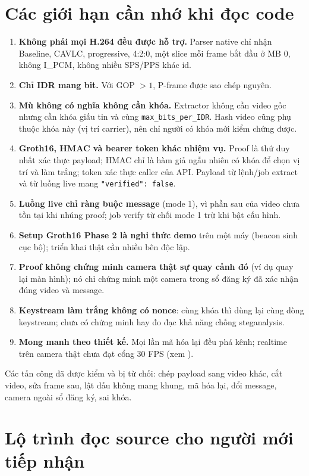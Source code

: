 \documentclass[11pt,a4paper]{article}
\begin{document}
\section{Các giới hạn cần nhớ khi đọc code}

\begin{enumerate}
  \item \textbf{Không phải mọi H.264 đều được hỗ trợ.} Parser native chỉ nhận
  Baseline, CAVLC, progressive, 4:2:0, một slice mỗi frame bắt đầu ở MB 0, không
  I\_PCM, không nhiều SPS/PPS khác id.
  \item \textbf{Chỉ IDR mang bit.} Với GOP $>1$, P-frame được sao chép nguyên.
  \item \textbf{Mù không có nghĩa không cần khóa.} Extractor không cần video gốc
  nhưng cần khóa giấu tin và cùng \texttt{max\_bits\_per\_IDR}. Hash video cũng phụ
  thuộc khóa này (vị trí carrier), nên chỉ người có khóa mới kiểm chứng được.
  \item \textbf{Groth16, HMAC và bearer token khác nhiệm vụ.} Proof là thứ duy nhất
  xác thực payload; HMAC chỉ là hàm giả ngẫu nhiên có khóa để chọn vị trí và làm trắng;
  token xác thực caller của API. Payload từ lệnh/job extract và từ luồng live mang
  \texttt{"verified": false}.
  \item \textbf{Luồng live chỉ ràng buộc message} (mode 1), vì phần sau của video chưa
  tồn tại khi nhúng proof; job verify từ chối mode 1 trừ khi bật cấu hình.
  \item \textbf{Setup Groth16 Phase 2 là nghi thức demo} trên một máy (beacon sinh cục
  bộ); triển khai thật cần nhiều bên độc lập.
  \item \textbf{Proof không chứng minh camera thật sự quay cảnh đó} (ví dụ quay lại
  màn hình); nó chỉ chứng minh một camera trong sổ đăng ký đã xác nhận đúng video và
  message.
  \item \textbf{Keystream làm trắng không có nonce}: cùng khóa thì dùng lại cùng dòng
  keystream; chưa có chứng minh hay đo đạc khả năng chống steganalysis.
  \item \textbf{Mong manh theo thiết kế.} Mọi lần mã hóa lại đều phá kênh; realtime trên
  camera thật chưa đạt cổng 30 FPS (xem ).
\end{enumerate}

Các tấn công đã được kiểm và bị từ chối: chép payload sang video khác, cắt video, sửa
frame sau, lật dấu không mang khung, mã hóa lại, đổi message, camera ngoài sổ đăng ký,
sai khóa.

\section{Lộ trình đọc source cho người mới tiếp nhận}
\end{document}

